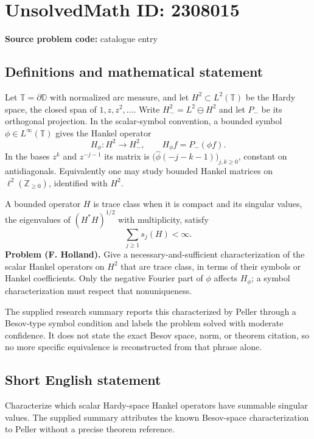 \documentclass[11pt]{article}
\begin{document}
\section*{UnsolvedMath ID: 2308015}
\textbf{Source problem code:} catalogue entry
\subsection{Definitions and mathematical statement}
Let $\mathbb T=\partial\mathbb D$ with normalized arc measure, and let $H^2\subset L^2(\mathbb T)$ be the Hardy space, the closed span of $1,z,z^2,\ldots$. Write $H^2_-=L^2\ominus H^2$ and let $P_-$ be its orthogonal projection. In the scalar-symbol convention, a bounded symbol $\phi\in L^\infty(\mathbb T)$ gives the Hankel operator
\[
H_\phi:H^2\to H^2_-,\qquad H_\phi f=P_-(\phi f).
\]
In the bases $z^k$ and $z^{-j-1}$ its matrix is $\big(\widehat\phi(-j-k-1)\big)_{j,k\geq0}$, constant on antidiagonals. Equivalently one may study bounded Hankel matrices on $\ell^2(\mathbb Z_{\geq0})$, identified with $H^2$.

A bounded operator $H$ is trace class when it is compact and its singular values, the eigenvalues of $(H^*H)^{1/2}$ with multiplicity, satisfy
\[
\sum_{j\geq1}s_j(H)<\infty.
\]
\textbf{Problem (F. Holland).} Give a necessary-and-sufficient characterization of the scalar Hankel operators on $H^2$ that are trace class, in terms of their symbols or Hankel coefficients. Only the negative Fourier part of $\phi$ affects $H_\phi$; a symbol characterization must respect that nonuniqueness.

The supplied research summary reports this characterized by Peller through a Besov-type symbol condition and labels the problem solved with moderate confidence. It does not state the exact Besov space, norm, or theorem citation, so no more specific equivalence is reconstructed from that phrase alone.
\subsection{Short English statement}
Characterize which scalar Hardy-space Hankel operators have summable singular values. The supplied summary attributes the known Besov-space characterization to Peller without a precise theorem reference.
\end{document}
